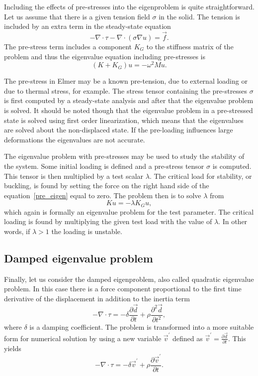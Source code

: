 Including the effects of pre-stresses into the eigenproblem is quite
straightforward. Let us assume that there is a given tension field
$\sigma$ in the solid. The tension is included by an extra term in the
steady-state equation
\begin{equation}
\label{pre_eigen}
-\nabla\cdot\tau -\nabla\cdot(\sigma\nabla u) = \vec{f}.
\end{equation}
The pre-stress term includes a component $K_G$ to the stiffness matrix
of the problem and thus the eigenvalue equation including pre-stresses
is
\begin{equation}
(K+K_G)u = -\omega^2Mu.
\end{equation} 

The pre-stress in Elmer may be a known pre-tension, due to external
loading or due to thermal stress, for example. The stress tensor
containing the pre-stresses $\sigma$ is first computed by a
steady-state analysis and after that the eigenvalue problem is
solved. It should be noted though that the eigenvalue problem in a
pre-stressed state is solved using first order linearization, which
means that the eigenvalues are solved about the non-displaced
state. If the pre-loading influences large deformations the
eigenvalues are not accurate.

The eigenvalue problem with pre-stresses may be used to study the
stability of the system. Some initial loading is defined and a
pre-stress tensor $\sigma$ is computed. This tensor is then multiplied
by a test scalar $\lambda$. The critical load for stability, or
buckling, is found by setting the force on the right hand side of the
equation~\ref{pre_eigen} equal to zero. The problem then is to solve
$\lambda$ from
\begin{equation}
Ku = -\lambda K_G u,
\end{equation}
which again is formally an eigenvalue problem for the test
parameter. The critical loading is found by multiplying the given test
load with the value of $\lambda$. In other words, if $\lambda > 1$ the
loading is unstable.

\subsection{Damped eigenvalue problem}

Finally, let us consider the damped eigenproblem, also called
quadratic eigenvalue problem. In this case there is a force component
proportional to the first time derivative of the displacement in
addition to the inertia term
\begin{equation}
-\nabla\cdot\tau = -\delta\frac{\partial \vec{d}}{\partial t} +
 \rho\frac{\partial^2 \vec{d}}{\partial t^2},
\end{equation}
where $\delta$ is a damping coefficient. The problem is transformed
into a more suitable form for numerical solution by using a new
variable $\vec{v}^{\prime}$ defined as
$\vec{v}^{\prime}=\frac{\partial \vec{d}}{\partial t}$. This yields
\begin{equation}
-\nabla\cdot\tau = -\delta\vec{v}^{\prime} +
\rho\frac{\partial \vec{v}^{\prime}}{\partial t}.
\end{equation}

